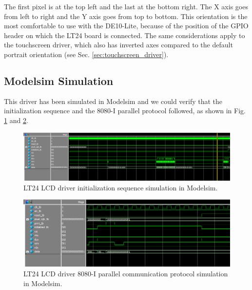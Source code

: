 \documentclass[11pt]{report}
\begin{document}
The first pixel is at the top left and the last at the bottom right. The X axis goes from left to right and the Y axis goes from top to bottom. This orientation is the most comfortable to use with the DE10-Lite, because of the position of the GPIO header on which the LT24 board is connected. The same considerations apply to the touchscreen driver, which also has inverted axes compared to the default portrait orientation (see Sec. \ref{sec:touchscreen_driver}).

\subsection{Modelsim Simulation}
This driver has been simulated in Modelsim and we could verify that the initialization sequence and the 8080-I parallel protocol followed, as shown in Fig. \ref{fig:init_sim} and \ref{fig:8080_sim}.

\begin{figure}[!h]
    \centering
    \includegraphics[width=1\linewidth]{images/graphic_interface_design/LT24_LCD_driver/initialization_simulation.png}
    \caption{LT24 LCD driver initialization sequence simulation in Modelsim.}
    \label{fig:init_sim}
\end{figure}

\begin{figure}[!h]
    \centering
    \includegraphics[width=1\linewidth]{images/graphic_interface_design/LT24_touchscreen_driver/8080_protocol_simulation.png}
    \caption{LT24 LCD driver 8080-I parallel communication protocol simulation in Modelsim.}
    \label{fig:8080_sim}
\end{figure}
\end{document}
